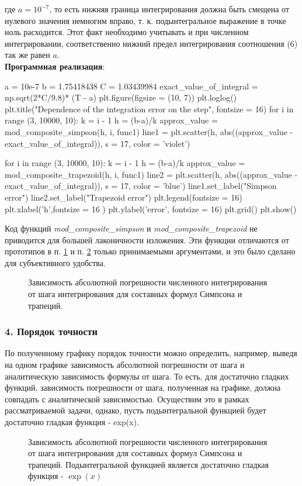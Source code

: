 где $a = 10^{-7}$, то есть нижняя граница интегрирования должна быть смещена от нулевого значения немногим вправо, т. к. подынтегральное выражение в точке ноль расходится. Этот факт необходимо учитывать и при численном интегрировании, соответственно нижний предел интегрирования соотношения (6) так же равен $a$. \\
\textbf{Программная реализация}:
\begin{python}
a = 10e-7
b = 1.75418438
C = 1.03439984
exact_value_of_integral = np.sqrt(2*C/9.8)* (T - a)
plt.figure(figsize = (10, 7))
plt.loglog()
plt.title("Dependence of the integration error on the step", fontsize = 16)
for i in range (3, 10000, 10):
  k = i - 1
  h = (b-a)/k
  approx_value = mod_composite_simpson(h, i, func1)
  line1 = plt.scatter(h, abs((approx_value - exact_value_of_integral)), s = 17, color = 'violet')


for i in range (3, 10000, 10):
  k = i - 1
  h = (b-a)/k
  approx_value = mod_composite_trapezoid(h, i, func1)
  line2 = plt.scatter(h, abs((approx_value - exact_value_of_integral)), s = 17, color = 'blue')
line1.set_label("Simpson error")
line2.set_label("Trapezoid error")
plt.legend(fontsize = 16)
plt.xlabel('h',fontsize = 16 )
plt.ylabel('error', fontsize = 16)
plt.grid()
plt.show()
\end{python}
Код функций \textit{mod_composite_simpson} и \textit{mod_composite_trapezoid} не приводится для большей лаконичности изложения. Эти функции отличаются от прототипов в п. \hyperlink{a}{1} и п. \hyperlink{b}{2} только принимаемыми аргументами, и это было сделано для субъективного удобства. 
\begin{figure}[h]
\hypertarget{f}{}
\caption{Зависимость абсолютной погрешности численного интегрирования от шага интегрирования для составных формул Симпсона и трапеций.}
\end{figure}
\subsubsection{4. Порядок точности}
По полученному графику порядок точности можно определить, например, выведя на одном графике зависимость абсолютной погрешности от шага и аналитическую зависимость формулы от шага. То есть, для достаточно гладких функций, зависимость погрешности от шага, полученная на графике, должна совпадать с аналитической зависимостью. Осуществим это в рамках рассматриваемой задачи, однако, пусть подынтегральной функцией будет достаточно гладкая функция - exp(x).
\begin{figure}[h]
\caption{Зависимость абсолютной погрешности численного интегрирования от шага интегрирования для составных формул Симпсона и трапеций. Подынтегральной функцией является достаточно гладкая функция - $\exp(x)$}
\end{figure}
